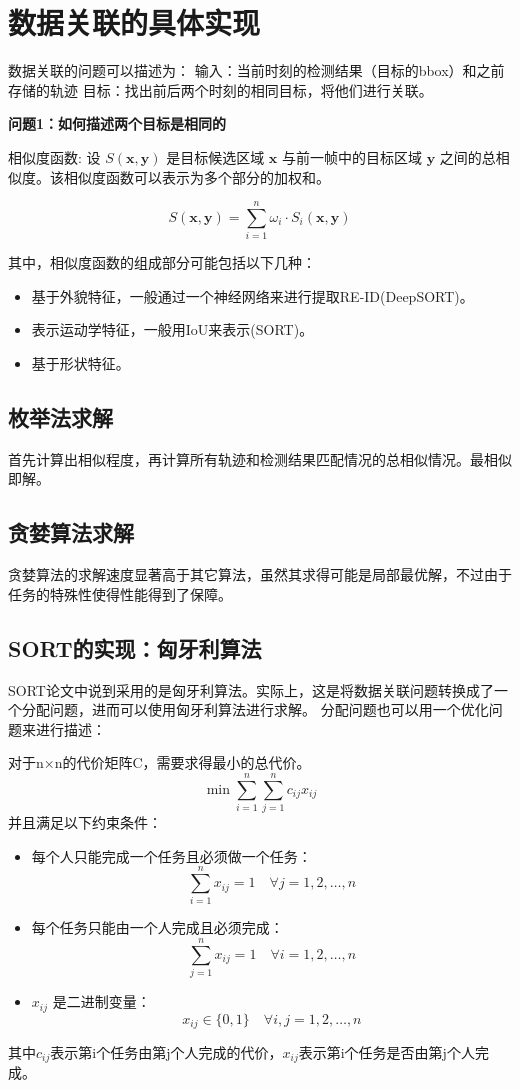 \chapter{数据关联的具体实现}
数据关联的问题可以描述为：
输入：当前时刻的检测结果（目标的bbox）和之前存储的轨迹
目标：找出前后两个时刻的相同目标，将他们进行关联。

\textbf{问题1：如何描述两个目标是相同的}

相似度函数:
设 \(S(\mathbf{x}, \mathbf{y})\) 是目标候选区域 \(\mathbf{x}\) 与前一帧中的目标区域 \(\mathbf{y}\) 之间的总相似度。该相似度函数可以表示为多个部分的加权和。

$$
	S(\mathbf{x}, \mathbf{y}) = \sum_{i=1}^{n} \omega_i \cdot S_i(\mathbf{x}, \mathbf{y})
$$

其中，相似度函数的组成部分可能包括以下几种：

\begin{itemize}[itemsep=-3pt]
	\item 基于外貌特征，一般通过一个神经网络来进行提取RE-ID(DeepSORT)。
	\item 表示运动学特征，一般用IoU来表示(SORT)。
	\item 基于形状特征。
\end{itemize}


\section{枚举法求解}
首先计算出相似程度，再计算所有轨迹和检测结果匹配情况的总相似情况。最相似即解。

\section{贪婪算法求解}
贪婪算法的求解速度显著高于其它算法，虽然其求得可能是局部最优解，不过由于任务的特殊性使得性能得到了保障。


\section{SORT的实现：匈牙利算法}
SORT论文中说到采用的是匈牙利算法。实际上，这是将数据关联问题转换成了一个分配问题，进而可以使用匈牙利算法进行求解。
分配问题也可以用一个优化问题来进行描述：
\begin{tcolorbox}
	对于n×n的代价矩阵C，需要求得最小的总代价。
	\[
	\min \sum_{i=1}^n \sum_{j=1}^n c_{ij} x_{ij}
	\]
	并且满足以下约束条件：
	\begin{itemize}
		\item 每个人只能完成一个任务且必须做一个任务：
		\[
		\sum_{i=1}^n x_{ij} = 1 \quad \forall j = 1, 2, \ldots, n
		\]
		\item 每个任务只能由一个人完成且必须完成：
		\[
		\sum_{j=1}^n x_{ij} = 1 \quad \forall i = 1, 2, \ldots, n
		\]
		\item \( x_{ij} \) 是二进制变量：
		\[
		x_{ij} \in \{0, 1\} \quad \forall i, j = 1, 2, \ldots, n
		\]
	\end{itemize}
	其中$c_{ij}$表示第i个任务由第j个人完成的代价，$x_{ij}$表示第i个任务是否由第j个人完成。
\end{tcolorbox}

